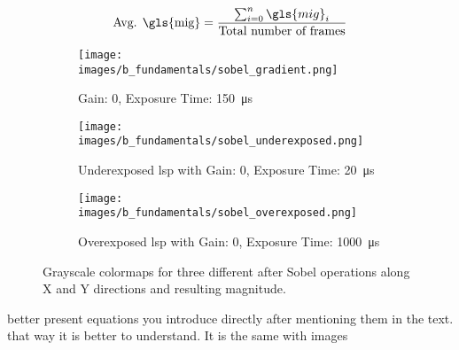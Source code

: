 \begin{equation}
    \text{Avg. \gls{mig}} = \frac{\sum_{i=0}^{n} \gls{mig}_i}{\text{Total number of frames}}
    \label{eqn:avg_mig}
\end{equation}

\begin{figure}[h]
    \centering
    \begin{subfigure}[b]{0.95\textwidth}
        \centering
        \texttt{[image: images/b\_fundamentals/sobel\_gradient.png]}
        \caption{Gain: 0, Exposure Time: \SI{150}{\micro\second}}
        \label{fig:sobel_gradient.png}
    \end{subfigure}
    \begin{subfigure}[b]{0.95\textwidth}
        \centering
        \texttt{[image: images/b\_fundamentals/sobel\_underexposed.png]}
        \caption{Underexposed \gls{lsp} with Gain: 0, Exposure Time: \SI{20}{\micro\second}}
        \label{fig:sobel_underexposed.png}
    \end{subfigure}
    \begin{subfigure}[b]{0.95\textwidth}
        \centering
        \texttt{[image: images/b\_fundamentals/sobel\_overexposed.png]}
        \caption{Overexposed \gls{lsp} with Gain: 0, Exposure Time: \SI{1000}{\micro\second}}
        \label{fig:sobel_overexposed.png}
    \end{subfigure}
    \caption{Grayscale colormaps for three different  after Sobel operations along X and Y directions and resulting magnitude.}
    \label{fig:sobel.png}
\end{figure}

better present equations you introduce directly after mentioning them in the text. that way it is better to understand. It is the same with images

\clearpage